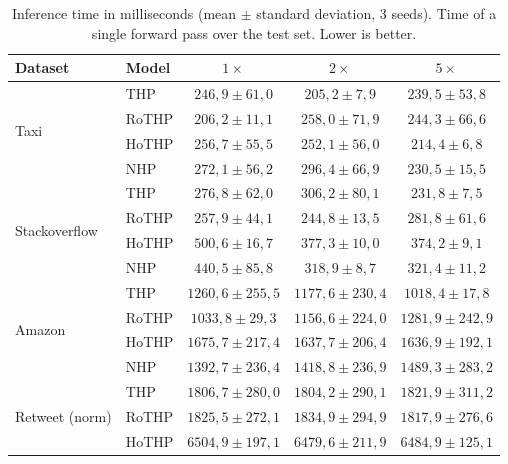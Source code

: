 \begin{table}[h!]
\centering
\caption{Inference time in milliseconds (mean $\pm$ standard deviation, 3 seeds). Time of a single forward pass over the test set. Lower is better.}
\label{tab:tempo-inferencia}
\begin{tabular}{llccc}
\toprule
Dataset & Model & $1\times$ & $2\times$ & $5\times$ \\
\midrule
\multirow{4}{*}{Taxi}
    & THP    & $246{,}9 \pm 61{,}0$ & $205{,}2 \pm 7{,}9$ & $239{,}5 \pm 53{,}8$ \\
    & RoTHP  & $206{,}2 \pm 11{,}1$ & $258{,}0 \pm 71{,}9$ & $244{,}3 \pm 66{,}6$ \\
    & HoTHP  & $256{,}7 \pm 55{,}5$ & $252{,}1 \pm 56{,}0$ & $214{,}4 \pm 6{,}8$ \\
    & NHP    & $272{,}1 \pm 56{,}2$ & $296{,}4 \pm 66{,}9$ & $230{,}5 \pm 15{,}5$ \\
\midrule
\multirow{4}{*}{Stackoverflow}
    & THP    & $276{,}8 \pm 62{,}0$ & $306{,}2 \pm 80{,}1$ & $231{,}8 \pm 7{,}5$ \\
    & RoTHP  & $257{,}9 \pm 44{,}1$ & $244{,}8 \pm 13{,}5$ & $281{,}8 \pm 61{,}6$ \\
    & HoTHP  & $500{,}6 \pm 16{,}7$ & $377{,}3 \pm 10{,}0$ & $374{,}2 \pm 9{,}1$ \\
    & NHP    & $440{,}5 \pm 85{,}8$ & $318{,}9 \pm 8{,}7$ & $321{,}4 \pm 11{,}2$ \\
\midrule
\multirow{4}{*}{Amazon}
    & THP    & $1260{,}6 \pm 255{,}5$ & $1177{,}6 \pm 230{,}4$ & $1018{,}4 \pm 17{,}8$ \\
    & RoTHP  & $1033{,}8 \pm 29{,}3$ & $1156{,}6 \pm 224{,}0$ & $1281{,}9 \pm 242{,}9$ \\
    & HoTHP  & $1675{,}7 \pm 217{,}4$ & $1637{,}7 \pm 206{,}4$ & $1636{,}9 \pm 192{,}1$ \\
    & NHP    & $1392{,}7 \pm 236{,}4$ & $1418{,}8 \pm 236{,}9$ & $1489{,}3 \pm 283{,}2$ \\
\midrule
\multirow{3}{*}{Retweet (norm)}
    & THP    & $1806{,}7 \pm 280{,}0$ & $1804{,}2 \pm 290{,}1$ & $1821{,}9 \pm 311{,}2$ \\
    & RoTHP  & $1825{,}5 \pm 272{,}1$ & $1834{,}9 \pm 294{,}9$ & $1817{,}9 \pm 276{,}6$ \\
    & HoTHP  & $6504{,}9 \pm 197{,}1$ & $6479{,}6 \pm 211{,}9$ & $6484{,}9 \pm 125{,}1$ \\
\bottomrule
\end{tabular}
\end{table}
